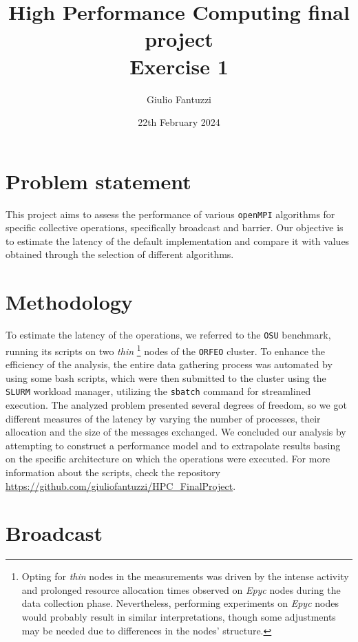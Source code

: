\documentclass{article}
\title{High Performance Computing final project\\Exercise 1}
\author{Giulio Fantuzzi}
\date{22th February 2024}
\begin{document}
\maketitle
{}
\section{Problem statement}\label{section:problemstatement}
This project aims to assess the performance of various \texttt{openMPI} \cite{openMPI} algorithms for specific collective operations, specifically broadcast and barrier. Our objective is to estimate the latency of the default implementation and compare it with values obtained through the selection of different algorithms.

\section{Methodology}\label{section:methodology}
To estimate the latency of the operations, we referred to the \texttt{OSU} benchmark\cite{osu-microbenchmarks}, running its scripts on two \textit{thin}
\footnote{Opting for \textit{thin} nodes in the measurements was driven by the intense activity and prolonged resource allocation times observed on \textit{Epyc} nodes during the data collection phase. Nevertheless, performing experiments on \textit{Epyc} nodes would probably result in similar interpretations, though some adjustments may be needed due to differences in the nodes' structure.}
nodes of the \texttt{ORFEO} \cite{orfeo} cluster. To enhance the efficiency of the analysis, the entire data gathering process was automated by using some bash scripts, which were then submitted to the cluster using the \texttt{SLURM} workload manager, utilizing the \texttt{sbatch} command for streamlined execution. The analyzed problem presented several degrees of freedom, so we got different measures of the latency by varying the number of processes, their allocation and the size of the messages exchanged. We concluded our analysis by attempting to construct a performance model and to extrapolate results basing on the specific architecture on which the operations were executed. For more information about the scripts, check the repository \href{https://github.com/giuliofantuzzi/HPC_FinalProject}{https://github.com/giuliofantuzzi/HPC\_FinalProject}.

\section{Broadcast}\label{section:broadcast}
\end{document}
